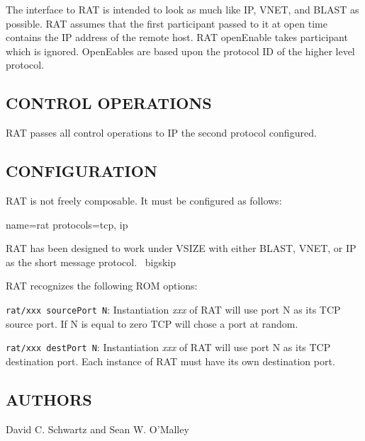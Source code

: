 The interface to RAT is intended to look as much like IP, VNET, and BLAST 
as possible. RAT assumes that the first participant passed to it at open 
time contains the IP address of the remote host. RAT openEnable takes 
participant which is ignored. OpenEables are based upon the protocol ID of 
the higher level protocol.

\subsection*{CONTROL OPERATIONS}

RAT passes all control operations to IP the second protocol configured. 

\subsection*{CONFIGURATION}

RAT is not freely composable. It must be configured as follows:

name=rat protocols=tcp, ip

RAT has been designed to work under VSIZE with either BLAST, VNET, or IP as the short message protocol. 
\
bigskip

\noindent
RAT recognizes the following ROM options:

\smallskip

{\tt rat/xxx sourcePort N}: Instantiation {\em xxx} of RAT 
will use port N as its TCP source port. If N is equal to zero
TCP will chose a port at random.

{\tt rat/xxx destPort N}: Instantiation {\em xxx} of RAT 
will use port N as its TCP destination port. Each instance of 
RAT must have its own destination port. 

\medskip

\subsection*{AUTHORS}

\noindent David C. Schwartz and Sean W. O'Malley



